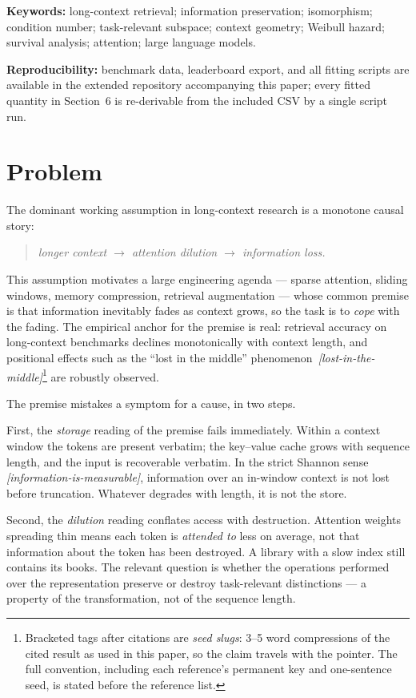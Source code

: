 \documentclass[11pt]{article}
\theoremstyle{remark}
\newif\ifslugs \slugstrue  %
\newcommand{\slug}[1]{\ifslugs\,{\small\textit{[#1]}}\fi}
\begin{document}
\noindent\textbf{Keywords:} long-context retrieval; information preservation;
isomorphism; condition number; task-relevant subspace; context geometry;
Weibull hazard; survival analysis; attention; large language models.

\medskip
\noindent\textbf{Reproducibility:} benchmark data, leaderboard export, and all
fitting scripts are available in the extended repository accompanying this
paper; every fitted quantity in Section~6 is re-derivable from the included
CSV by a single script run.

\section{Problem}
\label{sec:problem}

The dominant working assumption in long-context research is a monotone causal story:
\begin{quote}
\emph{longer context $\rightarrow$ attention dilution $\rightarrow$ information loss.}
\end{quote}
This assumption motivates a large engineering agenda --- sparse attention, sliding
windows, memory compression, retrieval augmentation --- whose common premise is that
information inevitably fades as context grows, so the task is to \emph{cope} with the
fading. The empirical anchor for the premise is real: retrieval accuracy on
long-context benchmarks declines monotonically with context length, and positional
effects such as the ``lost in the middle'' phenomenon \citep{liu2024lost}\slug{lost-in-the-middle}\footnote{Bracketed tags after citations are \emph{seed slugs}: 3--5 word compressions of the cited result as used in this paper, so the claim travels with the pointer. The full convention, including each reference's permanent key and one-sentence seed, is stated before the reference list.} are robustly
observed.

The premise mistakes a symptom for a cause, in two steps.

First, the \emph{storage} reading of the premise fails immediately. Within a context
window the tokens are present verbatim; the key--value cache grows with sequence
length, and the input is recoverable verbatim. In the strict Shannon sense
\citep{shannon1948}\slug{information-is-measurable}, information over an in-window context is not lost before
truncation. Whatever degrades with length, it is not the store.

Second, the \emph{dilution} reading conflates access with destruction. Attention
weights spreading thin means each token is \emph{attended to} less on average, not
that information about the token has been destroyed. A library with a slow index still contains its books. The relevant question is whether the operations performed over the
representation preserve or destroy task-relevant distinctions --- a property of the
transformation, not of the sequence length.
\end{document}
